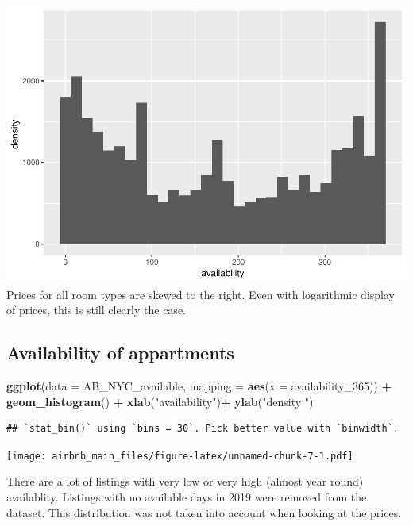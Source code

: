 \documentclass[]{article}
\newenvironment{Shaded}{\begin{snugshade}}{\end{snugshade}}
\newcommand{\DataTypeTok}[1]{\textcolor[rgb]{0.13,0.29,0.53}{#1}}
\newcommand{\DecValTok}[1]{\textcolor[rgb]{0.00,0.00,0.81}{#1}}
\newcommand{\KeywordTok}[1]{\textcolor[rgb]{0.13,0.29,0.53}{\textbf{#1}}}
\newcommand{\NormalTok}[1]{#1}
\newcommand{\OperatorTok}[1]{\textcolor[rgb]{0.81,0.36,0.00}{\textbf{#1}}}
\newcommand{\StringTok}[1]{\textcolor[rgb]{0.31,0.60,0.02}{#1}}
\begin{document}
\includegraphics{airbnb_main_files/figure-latex/unnamed-chunk-6-1.pdf}
Prices for all room types are skewed to the right. Even with logarithmic
display of prices, this is still clearly the case.

\hypertarget{availability-of-appartments}{%
\subsection{Availability of
appartments}\label{availability-of-appartments}}

\begin{Shaded}
\begin{Highlighting}[]
\KeywordTok{ggplot}\NormalTok{(}\DataTypeTok{data =}\NormalTok{ AB_NYC_available,}
       \DataTypeTok{mapping =} \KeywordTok{aes}\NormalTok{(}\DataTypeTok{x =}\NormalTok{ availability_}\DecValTok{365}\NormalTok{)) }\OperatorTok{+}
\StringTok{  }\KeywordTok{geom_histogram}\NormalTok{() }\OperatorTok{+}
\StringTok{  }\KeywordTok{xlab}\NormalTok{(}\StringTok{"availability"}\NormalTok{)}\OperatorTok{+}
\StringTok{  }\KeywordTok{ylab}\NormalTok{(}\StringTok{"density "}\NormalTok{)}
\end{Highlighting}
\end{Shaded}

\begin{verbatim}
## `stat_bin()` using `bins = 30`. Pick better value with `binwidth`.
\end{verbatim}

\texttt{[image: airbnb\_main\_files/figure-latex/unnamed-chunk-7-1.pdf]}

There are a lot of listings with very low or very high (almost year
round) availablity. Listings with no available days in 2019 were removed
from the dataset. This distribution was not taken into account when
looking at the prices.
\end{document}
